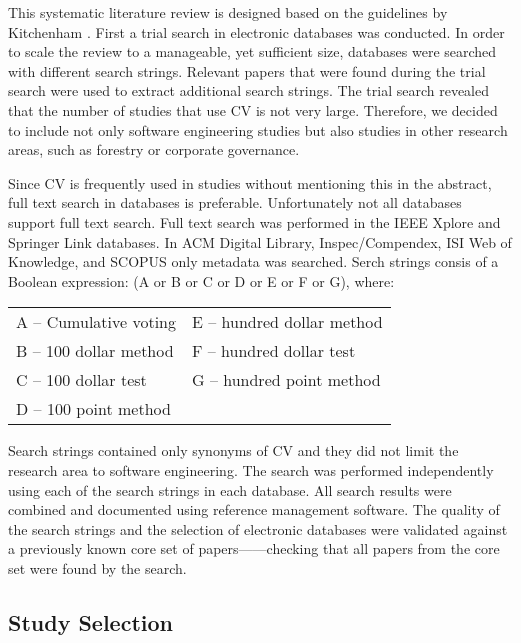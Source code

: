This systematic literature review is designed based on the guidelines by Kitchenham \citep{Kitchenham2007}. First a trial search in electronic databases was conducted. In order to scale the review to a manageable, yet sufficient size, databases were searched with different search strings. Relevant papers that were found during the trial search were used to extract additional search strings. The trial search revealed that the number of studies that use CV is not very large. Therefore, we decided to include not only software engineering studies but also studies in other research areas, such as forestry or corporate governance.

Since CV is frequently used in studies without mentioning this in the abstract, full text search in databases is preferable. Unfortunately not all databases support full text search. Full text search was performed in the IEEE Xplore and Springer Link databases. In ACM Digital Library, Inspec\slash Compendex, ISI Web of Knowledge, and SCOPUS only metadata was searched.
Serch strings consis of a Boolean expression: (A or B or C or D or E or F or G), where:

\begin{table}
	\scriptsize
\begin{tabular}{
>{\raggedright}p{}
>{\raggedright}p{}
}
A -- Cumulative voting & E -- hundred dollar method \tabularnewline
B -- 100 dollar method & F -- hundred dollar test \tabularnewline
C -- 100 dollar test & G -- hundred point method \tabularnewline
D -- 100 point method & \tabularnewline
\end{tabular}
\end{table}

Search strings contained only synonyms of CV and they did not limit the research area to software engineering. The search was performed independently using each of the search strings in each database. 
All search results were combined and documented using reference management software. The quality of the search strings and the selection of electronic databases were validated against a previously known core set of papers---\citep{Ahl2005,Berander2006,Chatzipetrou2010,Regnell2001}---checking that all papers from the core set were found by the search.%

\subsection{Study Selection}

